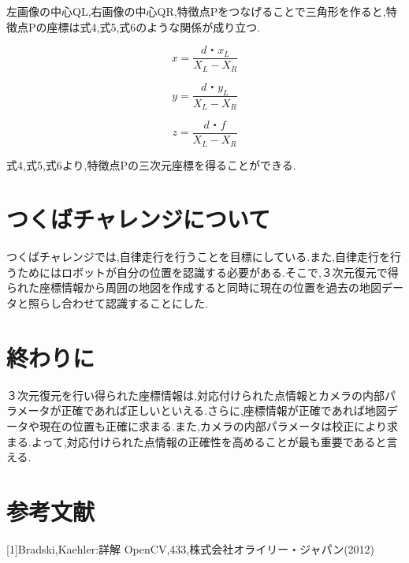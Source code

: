 \documentclass[a4paper]{jarticle}
\begin{document}
左画像の中心Q{\scriptsize L},右画像の中心Q{\scriptsize R},特徴点Pをつなげることで三角形を作ると,特徴点Pの座標は式4,式5,式6のような関係が成り立つ.

\begin{equation}
 x=\frac {d・x_{L}}{X_{L}-X_{R}}
\end{equation}

\begin{equation}
 y=\frac {d・y_{L}}{X_{L}-X_{R}}
\end{equation}

\begin{equation}
 z=\frac {d・f}{X_{L}-X_{R}}
\end{equation}


式4,式5,式6より,特徴点Pの三次元座標を得ることができる.


\section{つくばチャレンジについて}
つくばチャレンジでは,自律走行を行うことを目標にしている.また,自律走行を行うためにはロボットが自分の位置を認識する必要がある.そこで,３次元復元で得られた座標情報から周囲の地図を作成すると同時に現在の位置を過去の地図データと照らし合わせて認識することにした.


\section{終わりに}
３次元復元を行い得られた座標情報は,対応付けられた点情報とカメラの内部パラメータが正確であれば正しいといえる.さらに,座標情報が正確であれば地図データや現在の位置も正確に求まる.また,カメラの内部パラメータは校正により求まる.よって,対応付けられた点情報の正確性を高めることが最も重要であると言える.
\section{参考文献}
[1]Bradski,Kaehler:詳解 OpenCV,433,株式会社オライリー・ジャパン(2012)


\end{document}
